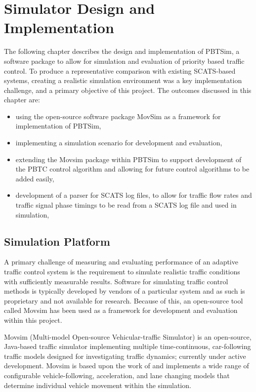 \chapter{Simulator Design and Implementation}

The following chapter describes the design and implementation of PBTSim, a software package to allow for simulation and evaluation of priority based traffic control. To produce a representative comparison with existing SCATS-based systems, creating a realistic simulation environment was a key implementation challenge, and a primary objective of this project. The outcomes discussed in this chapter are:

\begin{itemize}
\item using the open-source software package MovSim as a framework for implementation of PBTSim,
\item implementing a simulation scenario for development and evaluation,
\item extending the Movsim package within PBTSim to support development of the PBTC control algorithm and allowing for future control algorithms to be added easily,
\item development of a parser for SCATS log files, to allow for traffic flow rates and traffic signal phase timings to be read from a SCATS log file and used in simulation,
\end{itemize}

\section{Simulation Platform}

A primary challenge of measuring and evaluating performance of an adaptive traffic control system is the requirement to simulate realistic traffic conditions with sufficiently measurable results. Software for simulating traffic control methods is typically developed by vendors of a particular system and as such is proprietary and not available for research. Because of this, an open-source tool called Movsim has been used as a framework for development and evaluation within this project. 

Movsim (Multi-model Open-source Vehicular-traffic Simulator) is an open-source, Java-based traffic simulator implementing multiple time-continuous, car-following traffic models designed for investigating traffic dynamics; currently under active development. Movsim is based upon the work of  and implements a wide range of configurable vehicle-following, acceleration, and lane changing models that determine individual vehicle movement within the simulation.

